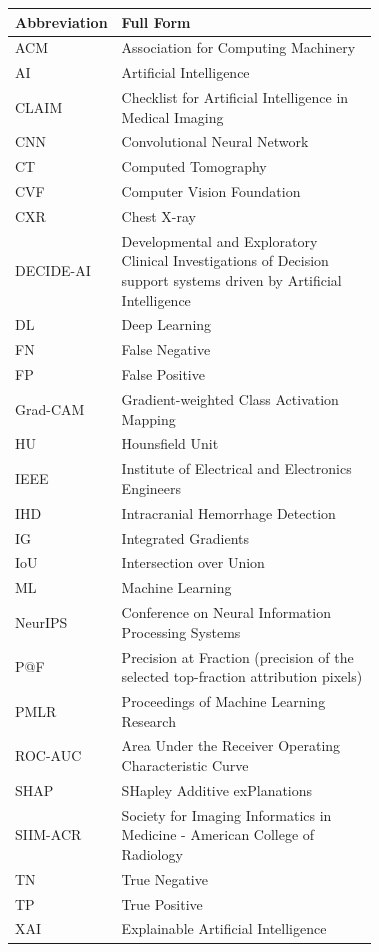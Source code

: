 \begin{longtable}{@{}l p{0.72\linewidth}@{}}
\toprule
\textbf{Abbreviation} & \textbf{Full Form}\\
\midrule
\endhead
ACM & Association for Computing Machinery\\
AI & Artificial Intelligence\\
CLAIM & Checklist for Artificial Intelligence in Medical Imaging\\
CNN & Convolutional Neural Network\\
CT & Computed Tomography\\
CVF & Computer Vision Foundation\\
CXR & Chest X-ray\\
DECIDE-AI & Developmental and Exploratory Clinical Investigations of Decision support systems driven by Artificial Intelligence\\
DL & Deep Learning\\
FN & False Negative\\
FP & False Positive\\
Grad-CAM & Gradient-weighted Class Activation Mapping\\
HU & Hounsfield Unit\\
IEEE & Institute of Electrical and Electronics Engineers\\
IHD & Intracranial Hemorrhage Detection\\
IG & Integrated Gradients\\
IoU & Intersection over Union\\
ML & Machine Learning\\
NeurIPS & Conference on Neural Information Processing Systems\\
P@F & Precision at Fraction (precision of the selected top-fraction attribution pixels)\\
PMLR & Proceedings of Machine Learning Research\\
ROC-AUC & Area Under the Receiver Operating Characteristic Curve\\
SHAP & SHapley Additive exPlanations\\
SIIM-ACR & Society for Imaging Informatics in Medicine - American College of Radiology\\
TN & True Negative\\
TP & True Positive\\
XAI & Explainable Artificial Intelligence\\
\bottomrule
\end{longtable}
